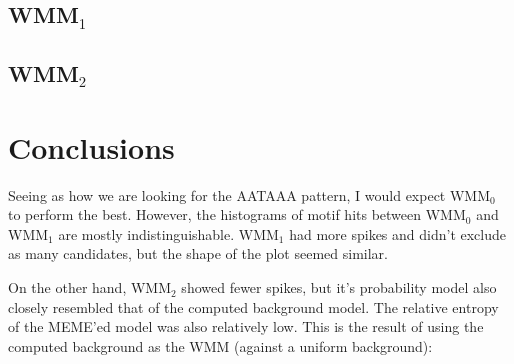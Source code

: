 \documentclass[a4paper, 12pt]{report}
\begin{document}
    \subsection{WMM$_1$}
        
        

    \subsection{WMM$_2$}
        
        

\section{Conclusions}
    Seeing as how we are looking for the AATAAA pattern, 
        I would expect WMM$_0$ to perform the best.
    However, the histograms of motif hits between WMM$_0$ and WMM$_1$ are mostly indistinguishable.  
    WMM$_1$ had more spikes and didn't exclude as many candidates, but the shape of the plot seemed similar.
    
    On the other hand, WMM$_2$ showed fewer spikes, 
        but it's probability model also closely resembled that of the computed background model.
    The relative entropy of the MEME'ed model was also relatively low.  
    This is the result of using the computed background as the WMM (against a uniform background): \\
    
\end{document}

